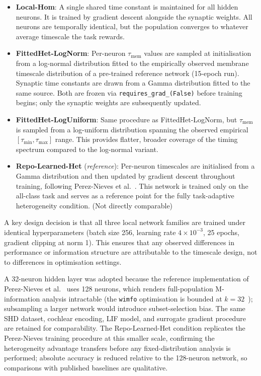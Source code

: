 \documentclass[12pt,twoside]{report}
\begin{document}
\begin{itemize}

    \item \textbf{Local-Hom}: A single shared time constant is maintained for all 
    hidden neurons. It is trained by gradient descent alongside the synaptic 
    weights. All neurons are temporally identical, but the population converges 
    to whatever average timescale the task rewards.

    \item \textbf{FittedHet-LogNorm}: Per-neuron $\tau_\text{mem}$ values are 
    sampled at initialisation from a log-normal distribution fitted to the 
    empirically observed membrane timescale distribution of a pre-trained reference 
    network (15-epoch run). Synaptic time constants are drawn from a Gamma 
    distribution fitted to the same source. Both are frozen via 
    \texttt{requires\_grad\_(False)} before training begins; only the synaptic 
    weights are subsequently updated.

    \item \textbf{FittedHet-LogUniform}: Same procedure as FittedHet-LogNorm, 
    but $\tau_\text{mem}$ is sampled from a log-uniform distribution spanning 
    the observed empirical $[\tau_\text{min}, \tau_\text{max}]$ range. This 
    provides flatter, broader coverage of the timing spectrum compared to the 
    log-normal variant.

    \item \textbf{Repo-Learned-Het} (\emph{reference}): Per-neuron timescales 
    are initialised from a Gamma distribution and then updated by gradient 
    descent throughout training, following Perez-Nieves et al.~\cite{pereznieves2021}. 
    This network is trained only on the all-class task and serves as a reference 
    point for the fully task-adaptive heterogeneity condition. (Not directly comparable)

\end{itemize}

A key design decision is that all three local network families are trained under 
identical hyperparameters (batch size 256, learning rate $4 \times 10^{-3}$, 
25 epochs, gradient clipping at norm 1). This ensures that any observed 
differences in performance or information structure are attributable to the 
timescale design, not to differences in optimisation settings.

A 32-neuron hidden layer was adopted because the reference implementation of
Perez-Nieves et al.~\cite{pereznieves2021} uses 128 neurons, which renders
full-population M-information analysis intractable (the \texttt{wimfo} optimisation
is bounded at $k = 32$~\cite{liardiscalable}); subsampling a larger network would
introduce subset-selection bias. The same SHD dataset, cochlear encoding, LIF model,
and surrogate gradient procedure~\cite{zenke2021, cramer2022} are retained for
comparability. The Repo-Learned-Het condition replicates the Perez-Nieves training
procedure at this smaller scale, confirming the heterogeneity advantage transfers
before any fixed-distribution analysis is performed; absolute accuracy is reduced
relative to the 128-neuron network, so comparisons with published baselines are
qualitative.
\end{document}
